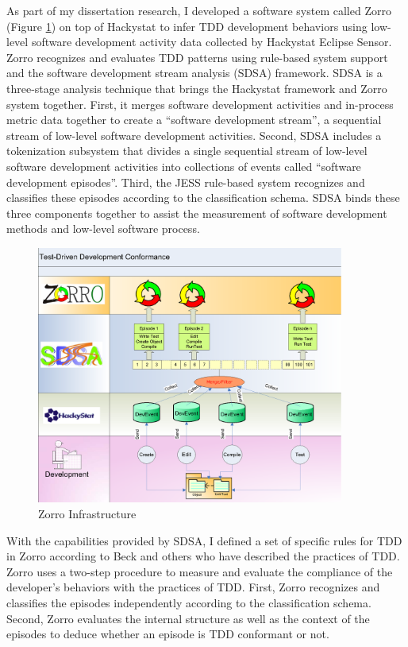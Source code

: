 As part of my dissertation research, I developed a software system
called Zorro (Figure \ref{fig:infra}) on top of Hackystat to infer TDD
development behaviors using low-level software development activity
data collected by Hackystat Eclipse Sensor.  Zorro recognizes and
evaluates TDD patterns using rule-based system support and the
software development stream analysis (SDSA) framework. SDSA is a
three-stage analysis technique that brings
the Hackystat framework and Zorro system together. First, it merges
software development activities and in-process metric data together to
create a ``software development stream'', a sequential stream of
low-level software development activities. Second, SDSA includes a
tokenization subsystem that divides a single sequential stream of
low-level software development activities into collections of events
called ``software development episodes''. Third, the JESS
\cite{Friedman-Hill:03} rule-based system recognizes and classifies
these episodes according to the classification schema.  SDSA binds these
three components together to assist the measurement of software
development methods and low-level software process.
\begin{figure}[htbp]
  \centering
  \includegraphics[width=0.9\textwidth]{figs/Zorro-Infrastructure.eps}
  \caption{Zorro Infrastructure}\label{fig:infra}
\end{figure}

With the capabilities provided by SDSA, I defined a set of specific rules
for TDD in Zorro according to Beck \cite{Beck:01,Beck:03} and others who have
described the practices of TDD. Zorro uses a two-step procedure to measure
and evaluate the compliance of the developer's behaviors with the practices
of TDD.  First, Zorro recognizes and classifies the episodes independently
according to the classification schema. Second, Zorro evaluates the
internal structure as well as the context of the episodes to deduce whether
an episode is TDD conformant or not.
















